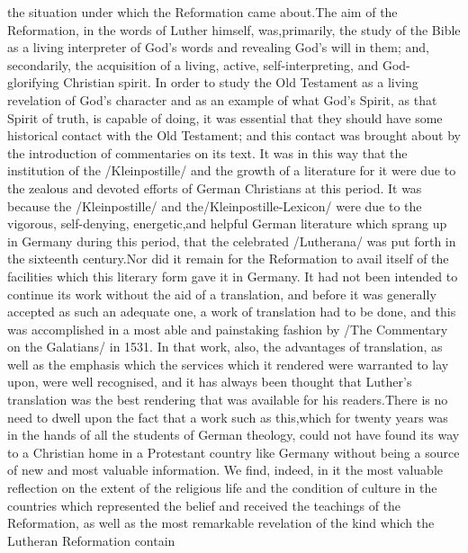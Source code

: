 \documentclass[a4paper]{article}
\begin{document}
the situation under which the Reformation came about.The aim of the Reformation, in the words of Luther himself, was,primarily, the study of the Bible as a living interpreter of God's words and revealing God's will in them; and, secondarily, the acquisition of a living, active, self-interpreting, and God-glorifying Christian spirit. In order to study the Old Testament as a living revelation of God's character and as an example of what God's Spirit, as that Spirit of truth, is capable of doing, it was essential that they should have some historical contact with the Old Testament; and this contact was brought about by the introduction of commentaries on its text. It was in this way that the institution of the /Kleinpostille/ and the growth of a literature for it were due to the zealous and devoted efforts of German Christians at this period. It was because the /Kleinpostille/ and the/Kleinpostille-Lexicon/ were due to the vigorous, self-denying, energetic,and helpful German literature which sprang up in Germany during this period, that the celebrated /Lutherana/ was put forth in the sixteenth century.Nor did it remain for the Reformation to avail itself of the facilities which this literary form gave it in Germany. It had not been intended to continue its work without the aid of a translation, and before it was generally accepted as such an adequate one, a work of translation had to be done, and this was accomplished in a most able and painstaking fashion by /The Commentary on the Galatians/ in 1531. In that work, also, the advantages of translation, as well as the emphasis which the services which it rendered were warranted to lay upon, were well recognised, and it has always been thought that Luther's translation was the best rendering that was available for his readers.There is no need to dwell upon the fact that a work such as this,which for twenty years was in the hands of all the students of German theology, could not have found its way to a Christian home in a Protestant country like Germany without being a source of new and most valuable information. We find, indeed, in it the most valuable reflection on the extent of the religious life and the condition of culture in the countries which represented the belief and received the teachings of the Reformation, as well as the most remarkable revelation of the kind which the Lutheran Reformation contain\\
\end{document}
